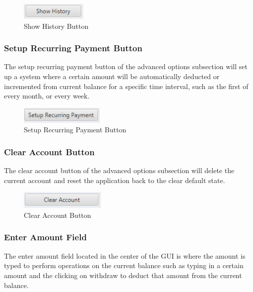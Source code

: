 \documentclass[12pt]{article}
\begin{document}
\begin{figure}[h!]
  \centering
  \includegraphics[]{show_history_button.png}
  \caption{Show History Button}
\end{figure}

\subsubsection{Setup Recurring Payment Button}
The setup recurring payment button of the advanced options subsection will set up a system where a certain amount will be automatically deducted or incremented from current balance for a specific time interval, such as the first of every month, or every week.

\begin{figure}[h!]
  \centering
  \includegraphics[]{setup_recurring_payment_button.png}
  \caption{Setup Recurring Payment Button}
\end{figure}

\subsubsection{Clear Account Button}
The clear account button of the advanced options subsection will delete the current account and reset the application back to the clear default state.

\begin{figure}[h!]
  \centering
  \includegraphics[]{clear_account_button.png}
  \caption{Clear Account Button}
\end{figure}

\subsubsection{Enter Amount Field}
The enter amount field located in the center of the GUI is where the amount is typed to perform operations on the current balance such as typing in a certain amount and the clicking on withdraw to deduct that amount from the current balance.
\end{document}
